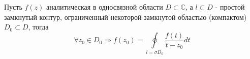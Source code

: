 
\begin{col-answer-preambule}
\end{col-answer-preambule}
\begin{theorem}
  Пусть $f(z)$ аналитическая в односвязной области $D \subset \mathbb{C}$, а $l \subset D$ - простой
  замкнутый контур, ограниченный некоторой замкнутой областью (компактом) $D_0 \subset D$, тогда
  \begin{equation}
    \label{eq:lecture32-01}
    \forall z_0 \in D_0 \Rightarrow f(z_0) = \oint\limits_{l = \sigma D_0}\dfrac{f(t)}{t - z_0}dt
  \end{equation}
\end{theorem}

